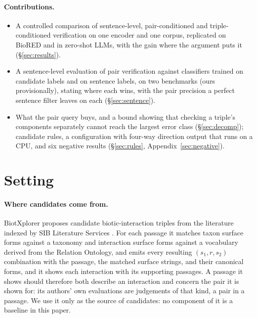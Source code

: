 \documentclass[11pt]{article}
\begin{document}
\paragraph{Contributions.}
\begin{itemize}\itemsep1pt\parskip0pt
\item A controlled comparison of sentence-level, pair-conditioned and triple-conditioned
      verification on one encoder and one corpus, replicated on BioRED and in
      zero-shot LLMs, with the gain where the argument puts it (\S\ref{sec:results}).
\item A sentence-level evaluation of pair verification against classifiers trained on candidate
      labels and on sentence labels, on two benchmarks (ours provisionally), stating where each wins, with the pair
      precision a perfect sentence filter leaves on each (\S\ref{sec:sentence}).
\item What the pair query buys, and a bound showing that checking a triple's components separately
      cannot reach the largest error class (\S\ref{sec:decomp}); candidate rules, a configuration
      with four-way direction output that runs on a CPU, and six negative results
      (\S\ref{sec:rules}, Appendix~\ref{sec:negative}).
\end{itemize}

\section{Setting}
\label{sec:setting}

\paragraph{Where candidates come from.}
BiotXplorer \citep{ruch2024biotxplorer} proposes candidate biotic-interaction triples from the
literature indexed by SIB Literature Services \citep{gobeill2020sibils}. For each passage it matches
taxon surface forms against a taxonomy and interaction surface forms against a vocabulary derived
from the Relation Ontology, and emits every resulting $(s_1, r, s_2)$ combination with the passage,
the matched surface strings, and their canonical forms, and it shows each interaction with its
supporting passages. A passage it shows should therefore both describe an interaction and concern
the pair it is shown for: its authors' own evaluations are judgements of that kind, a pair in a
passage. We use it only as the source of candidates: no component of it is a baseline in this paper.
\end{document}
